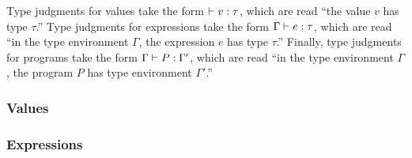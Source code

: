 \documentclass[oneside,11pt]{book}
\begin{document}
Type judgments for values take the form $\vdash v : \tau$, which are read
``the value $v$ has type $\tau$.'' Type judgments for expressions take
the form $\Gamma \vdash e : \tau$, which are read ``in the type
environment $\Gamma$, the expression $e$ has type $\tau$.'' Finally,
type judgments for programs take the form $\Gamma \vdash P : \Gamma'$,
which are read ``in the type environment $\Gamma$, the program $P$ has
type environment $\Gamma'$.''

\subsubsection*{Values }




\subsubsection*{Expressions }




\end{document}
